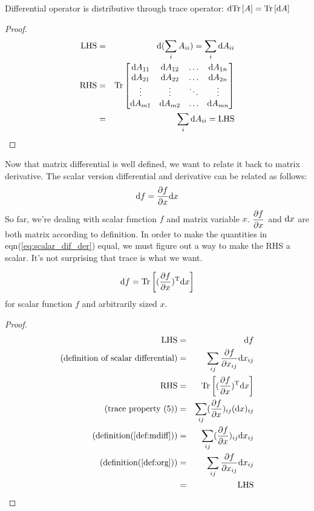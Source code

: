 \begin{mythm}
Differential operator is distributive through trace operator:
$\mathrm{d}\mathrm{Tr}\left[A\right] = \mathrm{Tr}\left[\mathrm{d}A\right]$
\end{mythm}

\begin{proof}
	\begin{eqnarray}
		\text{LHS} &=& \mathrm{d}(\sum_{i}{A_{ii}}) = \sum_{i}{\mathrm{d}A_{ii}}\\
		\text{RHS} &=&  \mathrm{Tr}\left[
			\begin{matrix}
			\mathrm{d}A_{11} & \mathrm{d}A_{12} & \ldots &\mathrm{d}A_{1n}\\
			\mathrm{d}A_{21} & \mathrm{d}A_{22} & \ldots &\mathrm{d}A_{2n}\\
			\vdots & \vdots & \ddots & \vdots \\
			\mathrm{d}A_{m1} & \mathrm{d}A_{m2} & \ldots &\mathrm{d}A_{mn}\\
			\end{matrix}
		\right] \\
		&=& \sum_{i}{\mathrm{d}A_{ii}} = \text{LHS} 
	\end{eqnarray}
\end{proof}

Now that matrix differential is well defined, we want to relate it 
back to matrix derivative. The scalar version differential and 
derivative can be related as follows:
\begin{equation}
	\mathrm{d}f = \dfrac{\partial f}{\partial x} \mathrm{d}x
	\label{eq:scalar_dif_der}
\end{equation}
So far, we're dealing with scalar function $f$ and matrix variable $x$. 
$\dfrac{\partial f}{\partial x}$ and $\mathrm{d}x$ are both matrix according to definition.
In order to make the quantities in eqn(\ref{eq:scalar_dif_der}) equal, 
we must figure out a way to make the RHS a scalar. It's not surprising
that trace is what we want. 

\begin{mythm}
	\label{thm:matrix_dif_der}
	\begin{equation}
		\mathrm{d}f = \mathrm{Tr}\left[(\dfrac{\partial f}{\partial x})^\mathrm{T} \mathrm{d}x\right]
		\label{eq:matrix_dif_der}
	\end{equation}
	for scalar function $f$ and arbitrarily sized $x$. 
\end{mythm}

\begin{proof}
	\begin{eqnarray}
		\text{LHS} &=& \mathrm{d}f \\
		\text{(definition of scalar differential)}
		&=& \sum_{ij}{\dfrac{\partial f}{\partial x_{ij}}\mathrm{d}x_{ij}} \\
		\text{RHS} &=&  \mathrm{Tr}\left[(\dfrac{\partial f}{\partial x})^\mathrm{T} \mathrm{d}x\right] \\
		\text{(trace property (5))}&=& \sum_{ij}(\dfrac{\partial f}{\partial x})_{ij} (\mathrm{d}x)_{ij} \\
		\text{(definition(\ref{def:mdiff}))} &=& \sum_{ij}(\dfrac{\partial f}{\partial x})_{ij} \mathrm{d}x_{ij} \\
		\text{(definition(\ref{def:org}))} &=& \sum_{ij}\dfrac{\partial f}{\partial x_{ij}} \mathrm{d}x_{ij} \\
		&=& \text{LHS}
	\end{eqnarray}
\end{proof}


